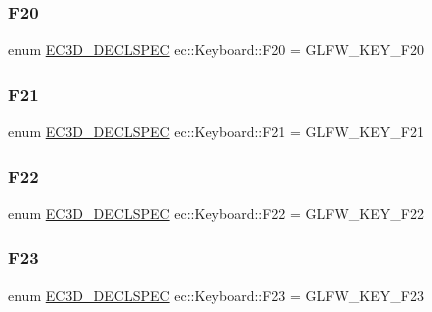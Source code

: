 \mbox{\label{classec_1_1_keyboard_ac67a6a2b6536cd6412c3c6b9dfb841e7}} 
\subsubsection{\texorpdfstring{F20}{F20}}
{\footnotesize\ttfamily enum \mbox{\hyperlink{_common_8h_aac42573e202ca3dd4d259c81691e2369}{E\+C3\+D\+\_\+\+D\+E\+C\+L\+S\+P\+EC}} ec\+::\+Keyboard\+::\+F20 = G\+L\+F\+W\+\_\+\+K\+E\+Y\+\_\+\+F20}

\mbox{\label{classec_1_1_keyboard_aeaa9b7f0c5875f1d8c04ad36e1e86794}} 
\subsubsection{\texorpdfstring{F21}{F21}}
{\footnotesize\ttfamily enum \mbox{\hyperlink{_common_8h_aac42573e202ca3dd4d259c81691e2369}{E\+C3\+D\+\_\+\+D\+E\+C\+L\+S\+P\+EC}} ec\+::\+Keyboard\+::\+F21 = G\+L\+F\+W\+\_\+\+K\+E\+Y\+\_\+\+F21}

\mbox{\label{classec_1_1_keyboard_af33c09fe67e20ee71d7b37c5d05c2760}} 
\subsubsection{\texorpdfstring{F22}{F22}}
{\footnotesize\ttfamily enum \mbox{\hyperlink{_common_8h_aac42573e202ca3dd4d259c81691e2369}{E\+C3\+D\+\_\+\+D\+E\+C\+L\+S\+P\+EC}} ec\+::\+Keyboard\+::\+F22 = G\+L\+F\+W\+\_\+\+K\+E\+Y\+\_\+\+F22}

\mbox{\label{classec_1_1_keyboard_aaa559281a2c74941811c3d9abe55d973}} 
\subsubsection{\texorpdfstring{F23}{F23}}
{\footnotesize\ttfamily enum \mbox{\hyperlink{_common_8h_aac42573e202ca3dd4d259c81691e2369}{E\+C3\+D\+\_\+\+D\+E\+C\+L\+S\+P\+EC}} ec\+::\+Keyboard\+::\+F23 = G\+L\+F\+W\+\_\+\+K\+E\+Y\+\_\+\+F23}


